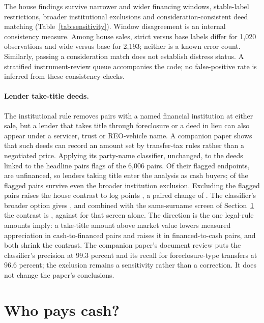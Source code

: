 \documentclass[12pt]{article}
\begin{document}
The house findings survive narrower and wider financing windows, stable-label restrictions, broader institutional exclusions and consideration-consistent deed matching (Table~\ref{tab:sensitivity}). Window disagreement is an internal consistency measure. Among house sales, strict versus base labels differ for 1,020 observations and wide versus base for 2,193; neither is a known error count. Similarly, passing a consideration match does not establish distress status. A stratified instrument-review queue accompanies the code; no false-positive rate is inferred from these consistency checks.


\paragraph{Lender take-title deeds.} The institutional rule removes pairs with a named financial institution at either sale, but a lender that takes title through foreclosure or a deed in lieu can also appear under a servicer, trust or REO-vehicle name. A companion paper \citep{loschi2026deed} shows that such deeds can record an amount set by transfer-tax rules rather than a negotiated price. Applying its party-name classifier, unchanged, to the deeds linked to the headline pairs flags \LegalPairs{} of the 6,006 pairs. Of their \LegalEnds{} flagged endpoints, \LegalEndsCash{} are unfinanced, so lenders taking title enter the analysis as cash buyers; \LegalNotBroad{} of the flagged pairs survive even the broader institution exclusion. Excluding the flagged pairs raises the house contrast to \NoLegalOLS{} log points \NoLegalOLSCI{}, a paired change of \NoLegalChange{} \NoLegalChangeCI{}. The classifier's broader option gives \NoLegalBroadOLS{}, and combined with the same-surname screen of Section~\ref{sec:who} the contrast is \NoLegalNoRelOLS{} \NoLegalNoRelOLSCI{}, against \NoRelOLS{} for that screen alone. The direction is the one legal-rule amounts imply: a take-title amount above market value lowers measured appreciation in cash-to-financed pairs and raises it in financed-to-cash pairs, and both shrink the contrast. The companion paper's document review puts the classifier's precision at 99.3 percent and its recall for foreclosure-type transfers at 96.6 percent; the exclusion remains a sensitivity rather than a correction. It does not change the paper's conclusions.

\section{Who pays cash?}\label{sec:who}
\end{document}
